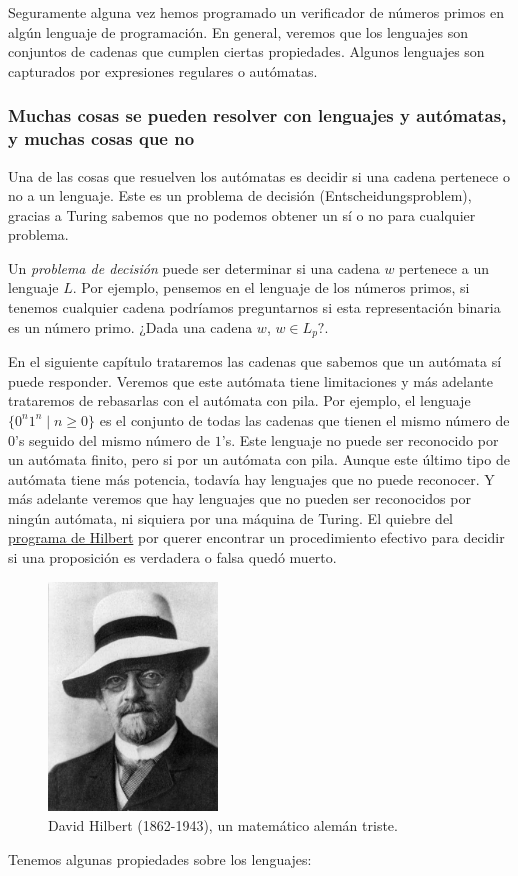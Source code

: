 \begin{enumerate}
    Seguramente alguna vez hemos programado un verificador de números primos en algún lenguaje de programación. En general, 
    veremos que los lenguajes son conjuntos de cadenas que cumplen ciertas propiedades. Algunos lenguajes son capturados por expresiones regulares o autómatas.

    \subsubsection{Muchas cosas se pueden resolver con lenguajes y autómatas, y muchas cosas que no}

Una de las cosas que resuelven los autómatas es decidir si una cadena pertenece 
o no a un lenguaje. Este es un problema de decisión (Entscheidungsproblem), 
gracias a Turing sabemos que no podemos obtener un sí o no para cualquier problema. 

Un \textit{problema de decisión} puede ser determinar si una cadena $w$ pertenece a un lenguaje $L$. 
Por ejemplo, pensemos en el lenguaje de los números primos, si tenemos cualquier cadena podríamos preguntarnos
si esta representación binaria es un número primo. ¿Dada una cadena $w$, $w \in L_p?$.  

En el siguiente capítulo trataremos las cadenas que sabemos que un autómata sí puede responder. 
Veremos que este autómata tiene limitaciones y más adelante trataremos de rebasarlas con el autómata con pila.
Por ejemplo, el lenguaje $\{0^n1^n \mid n \geq 0\}$ es el conjunto de todas las cadenas que tienen el mismo número de $0$'s seguido del mismo número de $1$'s.
Este lenguaje no puede ser reconocido por un autómata finito, pero si por un autómata con pila. Aunque este último tipo de autómata tiene más potencia, todavía hay lenguajes que no puede reconocer.
Y más adelante veremos que hay lenguajes que no pueden ser reconocidos por ningún autómata, ni siquiera por una máquina de Turing. El quiebre del \href{https://plato.stanford.edu/entries/hilbert-program/}{programa de Hilbert} por querer encontrar
un procedimiento efectivo para decidir si una proposición es verdadera o falsa quedó muerto. 

\begin{figure}
    \centering
    \includegraphics[width=0.4\textwidth]{images/Hilbert.jpg}
    \caption{David Hilbert (1862-1943), un matemático alemán triste.}
\end{figure}

\end{enumerate}
Tenemos algunas propiedades sobre los lenguajes: 

